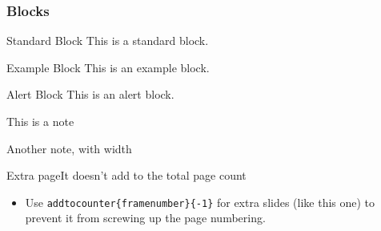 \documentclass[11 pt,t]{beamer}
\begin{document}
\begin{frame}
    \frametitle{Blocks}

    \begin{block}{Standard Block}
        This is a standard block.
    \end{block}

    \begin{exampleblock}{Example Block}
        This is an example block.
    \end{exampleblock}

    \begin{alertblock}{Alert Block}
        This is an alert block.
    \end{alertblock}

    \begin{noteblock}
        This is a note
    \end{noteblock}

    \begin{noteblock}[wd=5cm]
        Another note, with width
    \end{noteblock}

\end{frame}

\addtocounter{framenumber}{-1}
\begin{frame}[c]{Extra page}{It doesn't add to the total page count}
    \begin{itemize}
        \item Use \alert{\texttt{addtocounter\{framenumber\}\{-1\}}} for extra slides (like this one) to prevent it from screwing up the page numbering.
    \end{itemize}
\end{frame}
\end{document}
